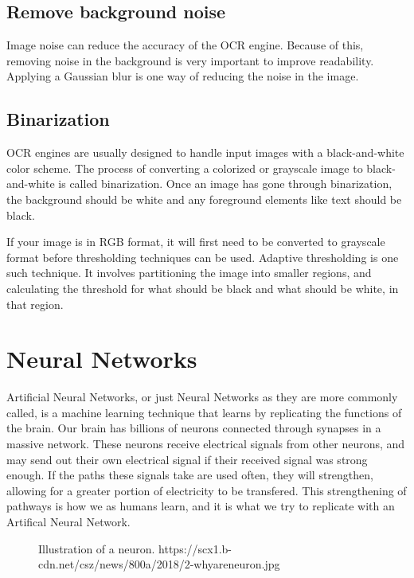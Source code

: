 \subsection{Remove background noise}\label{subsec:remove-background-noise}
Image noise can reduce the accuracy of the OCR engine.
Because of this, removing noise in the background is very important to improve readability.
Applying a Gaussian blur is one way of reducing the noise in the image.

\subsection{Binarization}\label{subsec:how-to-create-contrast}
OCR engines are usually designed to handle input images with a black-and-white color scheme.
The process of converting a colorized or grayscale image to black-and-white is called binarization.
Once an image has gone through binarization, the background should be white and any foreground elements like text should be black.

If your image is in RGB format, it will first need to be converted to grayscale format before thresholding techniques can be used.
Adaptive thresholding is one such technique.
It involves partitioning the image into smaller regions, and calculating the threshold for what should be black and what should be white, in that region.

\section{Neural Networks}\label{sec:neural networks}
Artificial Neural Networks, or just Neural Networks as they are more commonly called, is a machine learning technique that learns by replicating the functions of the brain.
Our brain has billions of neurons connected through synapses in a massive network.
These neurons receive electrical signals from other neurons, and may send out their own electrical signal if their received signal was strong enough.
If the paths these signals take are used often, they will strengthen, allowing for a greater portion of electricity to be transfered.
This strengthening of pathways is how we as humans learn, and it is what we try to replicate with an Artifical Neural Network.
\begin{figure}[h]
    \caption{Illustration of a neuron. https://scx1.b-cdn.net/csz/news/800a/2018/2-whyareneuron.jpg}
    \label{fig:figure2.3}
\end{figure}

